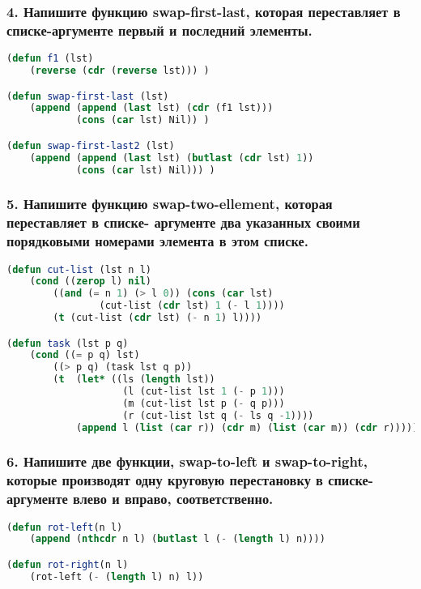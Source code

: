 \subsubsection*{4. Напишите функцию swap-first-last, которая переставляет в списке-аргументе первый и последний элементы.}
\begin{lstlisting}[language=Lisp]
(defun f1 (lst)
	(reverse (cdr (reverse lst))) )

(defun swap-first-last (lst)
	(append (append (last lst) (cdr (f1 lst))) 
			(cons (car lst) Nil)) )

(defun swap-first-last2 (lst)
	(append (append (last lst) (butlast (cdr lst) 1)) 
			(cons (car lst) Nil))) )

\end{lstlisting}

\newpage
\subsubsection*{5. Напишите функцию swap-two-ellement, которая переставляет в списке- аргументе два указанных своими порядковыми номерами элемента в этом списке.}
\begin{lstlisting}[language=Lisp]
(defun cut-list (lst n l) 
	(cond ((zerop l) nil)
		((and (= n 1) (> l 0)) (cons (car lst) 
				(cut-list (cdr lst) 1 (- l 1))))
		(t (cut-list (cdr lst) (- n 1) l))))

(defun task (lst p q)
	(cond ((= p q) lst)
		((> p q) (task lst q p))
		(t  (let* ((ls (length lst))
					(l (cut-list lst 1 (- p 1)))
					(m (cut-list lst p (- q p)))
					(r (cut-list lst q (- ls q -1))))
			(append l (list (car r)) (cdr m) (list (car m)) (cdr r))))))

\end{lstlisting}

\subsubsection*{6. Напишите две функции, swap-to-left и swap-to-right, которые производят одну круговую перестановку в списке-аргументе влево и вправо, соответственно.}
\begin{lstlisting}[language=Lisp]
(defun rot-left(n l)
	(append (nthcdr n l) (butlast l (- (length l) n))))

(defun rot-right(n l)
	(rot-left (- (length l) n) l))
\end{lstlisting}


\newpage
